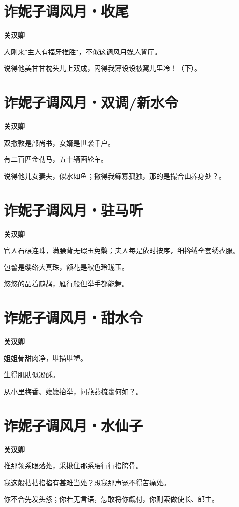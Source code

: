 \documentclass[12pt,a4paper]{ctexbook}
\begin{document}
\section{诈妮子调风月・收尾}
\textbf{关汉卿}\par\vspace{0.5em}
大刚来"主人有福牙推胜"，不似这调风月媒人背厅。\par
说得他美甘甘枕头儿上双成，闪得我薄设设被窝儿里冷！（下）。\par

\section{诈妮子调风月・双调/新水令}
\textbf{关汉卿}\par\vspace{0.5em}
双撒敦是部尚书，女婿是世袭千户。\par
有二百匹金勒马，五十辆画轮车。\par
说得他儿女妻夫，似水如鱼；撇得我鳏寡孤独，那的是撮合山养身处？。\par

\section{诈妮子调风月・驻马听}
\textbf{关汉卿}\par\vspace{0.5em}
官人石碾连珠，满腰背无瑕玉免鹘；夫人每是依时按序，细搀绒全套绣衣服。\par
包髻是缨络大真珠，额花是秋色玲珑玉。\par
悠悠的品着鹧鸪，雁行般但举手都能舞。\par

\section{诈妮子调风月・甜水令}
\textbf{关汉卿}\par\vspace{0.5em}
姐姐骨甜肉净，堪描堪塑。\par
生得肌肤似凝酥。\par
从小里梅香、嬷嬷抬举，问燕燕梳裹何如？。\par

\section{诈妮子调风月・水仙子}
\textbf{关汉卿}\par\vspace{0.5em}
推那领系眼落处，采揪住那系腰行行掐胯骨。\par
我这般拈拈掐掐有甚难当处？想我那声冤不得苦痛处。\par
你不合先发头怒；你若无言语，怎敢将你觑付，你则索做使长、郎主。\par
\end{document}
